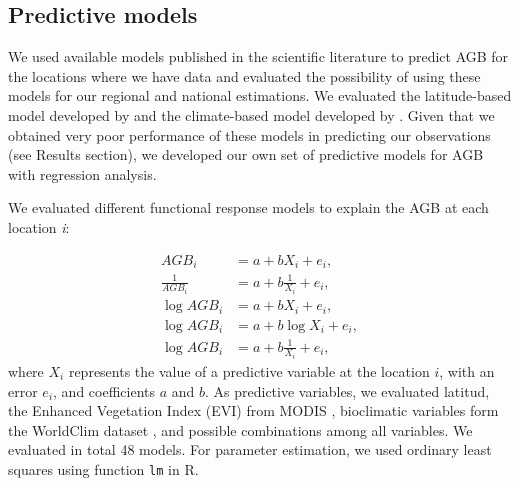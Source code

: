 \documentclass[review, authoryear]{elsarticle}   	%
\begin{document}

\subsection{Predictive models}
We used available models published in the scientific literature to predict AGB for the locations where we have data and evaluated the possibility of using these models for our regional and national estimations. We evaluated the latitude-based model developed by \citet{Twilley1992} and the climate-based model developed by \citet{CONL:CONL12060}. Given that we obtained very poor performance of these models in predicting our observations (see Results section), we developed our own set of predictive models for AGB with regression analysis. 

We evaluated different functional response models to explain the AGB at each location \emph{i}:

\begin{align}
AGB_{i} &= a+bX_{i}+e_{i}, \\
\frac{1}{AGB_{i}} &= a+b\frac{1}{X_{i}}+e_{i}, \\
\log{AGB_{i}} &= a+bX_{i}+e_{i}, \\
\log{AGB_{i}} &= a+b\log{X_{i}}+e_{i}, \\
\log{AGB_{i}} &= a+b\frac{1}{X_{i}}+e_{i}, 
\end{align} 
where $X_i$ represents the value of a predictive variable at the location $i$, with an error $e_i$, and coefficients $a$ and $b$. As predictive variables, we evaluated latitud, the Enhanced Vegetation Index (EVI) from MODIS \citep{MODIS2015}, bioclimatic variables form the WorldClim dataset \citep{Hijmans2005}, and possible combinations among all variables. We evaluated in total 48 models. For parameter estimation, we used ordinary least squares using function {\tt lm} in R.
\end{document}
